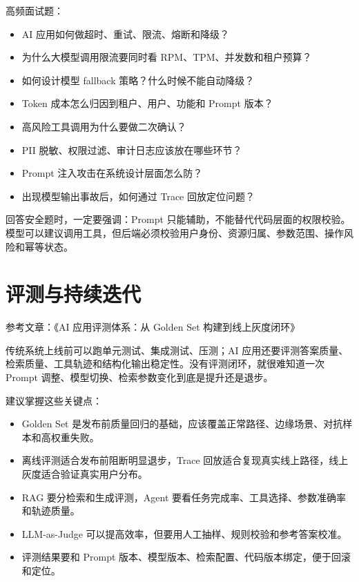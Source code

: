 \documentclass[9pt,a4paper,twocolumn]{ctexart}
\begin{document}
高频面试题：


\begin{itemize}[itemsep=1pt, topsep=2pt]
  \item AI 应用如何做超时、重试、限流、熔断和降级？
  \item 为什么大模型调用限流要同时看 RPM、TPM、并发数和租户预算？
  \item 如何设计模型 fallback 策略？什么时候不能自动降级？
  \item Token 成本怎么归因到租户、用户、功能和 Prompt 版本？
  \item 高风险工具调用为什么要做二次确认？
  \item PII 脱敏、权限过滤、审计日志应该放在哪些环节？
  \item Prompt 注入攻击在系统设计层面怎么防？
  \item 出现模型输出事故后，如何通过 Trace 回放定位问题？
\end{itemize}


回答安全题时，一定要强调：Prompt 只能辅助，不能替代代码层面的权限校验。模型可以建议调用工具，但后端必须校验用户身份、资源归属、参数范围、操作风险和幂等状态。



\section*{评测与持续迭代}


参考文章：《AI 应用评测体系：从 Golden Set 构建到线上灰度闭环》



传统系统上线前可以跑单元测试、集成测试、压测；AI 应用还要评测答案质量、检索质量、工具轨迹和结构化输出稳定性。没有评测闭环，就很难知道一次 Prompt 调整、模型切换、检索参数变化到底是提升还是退步。



建议掌握这些关键点：


\begin{itemize}[itemsep=1pt, topsep=2pt]
  \item Golden Set 是发布前质量回归的基础，应该覆盖正常路径、边缘场景、对抗样本和高权重失败。
  \item 离线评测适合发布前阻断明显退步，Trace 回放适合复现真实线上路径，线上灰度适合验证真实用户分布。
  \item RAG 要分检索和生成评测，Agent 要看任务完成率、工具选择、参数准确率和轨迹质量。
  \item LLM-as-Judge 可以提高效率，但要用人工抽样、规则校验和参考答案校准。
  \item 评测结果要和 Prompt 版本、模型版本、检索配置、代码版本绑定，便于回滚和定位。
\end{itemize}
\end{document}
